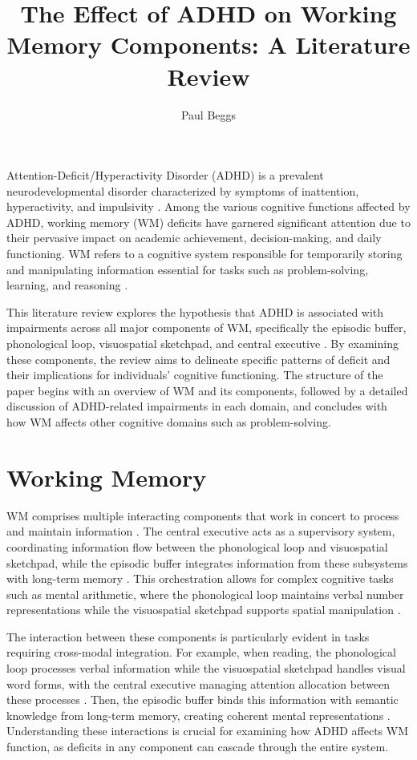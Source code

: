 \documentclass[stu]{apa7}
\title{The Effect of ADHD on Working Memory Components: A Literature Review}
\author{Paul Beggs}
\begin{document}
\maketitle

Attention-Deficit/Hyperactivity Disorder (ADHD) is a prevalent neurodevelopmental disorder characterized by symptoms of inattention, hyperactivity, and impulsivity \parencite{faraone_attention-deficithyperactivity_2015}. Among the various cognitive functions affected by ADHD, working memory (WM) deficits have garnered significant attention due to their pervasive impact on academic achievement, decision-making, and daily functioning. WM refers to a cognitive system responsible for temporarily storing and manipulating information essential for tasks such as problem-solving, learning, and reasoning \parencite{baddeley_working_2020}.

This literature review explores the hypothesis that ADHD is associated with impairments across all major components of WM, specifically the episodic buffer, phonological loop, visuospatial sketchpad, and central executive \parencite{baddeley_developments_1994}. By examining these components, the review aims to delineate specific patterns of deficit and their implications for individuals' cognitive functioning. The structure of the paper begins with an overview of WM and its components, followed by a detailed discussion of ADHD-related impairments in each domain, and concludes with how WM affects other cognitive domains such as problem-solving.

\section{Working Memory}

WM comprises multiple interacting components that work in concert to process and maintain information \parencite{baddeley_working_2020}. The central executive acts as a supervisory system, coordinating information flow between the phonological loop and visuospatial sketchpad, while the episodic buffer integrates information from these subsystems with long-term memory \parencite{baddeley_developments_1994}. This orchestration allows for complex cognitive tasks such as mental arithmetic, where the phonological loop maintains verbal number representations while the visuospatial sketchpad supports spatial manipulation \parencite{kofler_working_2020}.

The interaction between these components is particularly evident in tasks requiring cross-modal integration. For example, when reading, the phonological loop processes verbal information while the visuospatial sketchpad handles visual word forms, with the central executive managing attention allocation between these processes \parencite{friedman_reading_2017}. Then, the episodic buffer binds this information with semantic knowledge from long-term memory, creating coherent mental representations \parencite{baddeley_working_2012}. Understanding these interactions is crucial for examining how ADHD affects WM function, as deficits in any component can cascade through the entire system.
\end{document}
